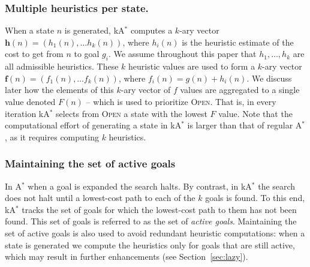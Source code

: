 \documentclass{aicom2e}
\newcommand{\astar}{A$^*$}
\newcommand{\kastar}{kA$^*$}
\newcommand{\open}{\textsc{Open}}
\begin{document}
\subsubsection*{Multiple heuristics per state.}


When a state $n$ is generated, \kastar{} computes a $k$-ary vector
$\textbf{h}(n)=(h_1(n),\ldots h_k(n))$, where $h_i(n)$ is the heuristic
estimate of the cost to get from $n$ to goal $g_i$. 
We assume throughout this paper that $h_1,\ldots,h_k$ are all admissible heuristics. 
These $k$ heuristic values
are used to form a $k$-ary vector $\textbf{f}(n)=(f_1(n),\ldots f_k(n))$, where
$f_i(n)=g(n)+h_i(n)$. We discuss later how the elements of this $k$-ary vector
of $f$ values are aggregated to a single value denoted $F(n)$ -- which is used
to prioritize
\open. That is, in every iteration \kastar{} selects from \open{} a state with
the lowest $F$ value. Note that the computational effort of generating a state
in \kastar{} is larger than that of regular \astar{}, as it requires computing
$k$ heuristics.


\subsubsection*{Maintaining the set of active goals}

In \astar{} when a goal is expanded the search halts. By contrast, in \kastar{}
the search does not halt until a lowest-cost path to each of the $k$ goals is
found. To this end, \kastar{} tracks the set of goals for which the lowest-cost
path to them has not been found. This set of goals is referred to as the set of {\em
active goals}. Maintaining the set of active goals is also used to avoid
redundant heuristic computations: when a state is generated we compute the
heuristics only for goals that are still active, which may result in further enhancements (see Section~\ref{sec:lazy}). 



\end{document}
